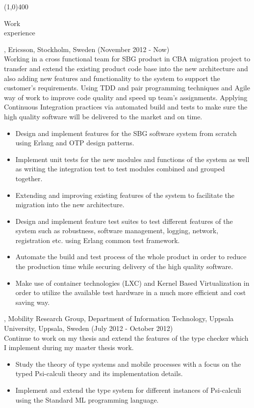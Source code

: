 \documentclass{resume}
\begin{document}
\begin{center}
\line(1,0){400}
\end{center}

\begin{category}{Work \\experience}

, Ericsson, Stockholm, Sweden (November 2012 - Now)\\
Working in a cross functional team for SBG product in CBA migration project to 
transfer and extend the existing product code base into the new architecture and also 
adding new features and functionality to the system to support the customer's requirements.
Using TDD and pair programming techniques and Agile way of work to improve code quality and
speed up team's assignments. Applying Continuous Integration practices via automated build and tests to 
make sure the high quality software will be delivered to the market and on time.
\begin{itemize}
 \item Design and implement features for the SBG software system from scratch using 
       Erlang and OTP design patterns.
 \item Implement unit tests for the new modules and functions of the system as well as 
       writing the integration test to test modules combined and grouped together. 
 \item Extending and improving existing features of the system to facilitate the 
       migration into the new architecture.
 \item Design and implement feature test suites to test different features of the 
       system such as robustness, software management, logging, network, registration 
       etc. using Erlang common test framework.
 \item Automate the build and test process of the whole product in order to reduce the production time
       while securing delivery of the high quality software.
 \item Make use of container technologies (LXC) and Kernel Based Virtualization in order to utilize the 
       available test hardware in a much more efficient and cost saving way.
\end{itemize}

, Mobility Research Group, Department of Information Technology, 
Uppsala University, Uppsala, Sweden (July 2012 - October 2012)\\
Continue to work on my thesis and extend the features of the type checker which I 
implement during my master thesis work.
\begin{itemize}
 \item Study the theory of type systems and mobile processes with a 
       focus on the typed Psi-calculi theory and its implementation details.
 \item Implement and extend the type system for different instances of Psi-calculi 
       using the Standard ML programming language.
\end{itemize}


\end{category}
\end{document}
